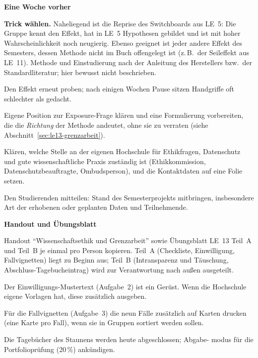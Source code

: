 \begin{vorbereitung}
\textbf{Eine Woche vorher}
\begin{checkliste}
  \item \textbf{Trick wählen.} Naheliegend ist die Reprise des
    Switchboards aus LE~5: Die Gruppe kennt den Effekt, hat in LE~5
    Hypothesen gebildet und ist mit hoher Wahrscheinlichkeit noch neugierig.
    Ebenso geeignet ist jeder andere Effekt des Semesters, dessen Methode
    nicht im Buch offengelegt ist (z.\,B.\ der Seileffekt aus LE~11).
    Methode und Einstudierung nach der Anleitung des Herstellers bzw.\ der
    Standardliteratur; hier bewusst nicht beschrieben.
  \item Den Effekt erneut proben; nach einigen Wochen Pause sitzen
    Handgriffe oft schlechter als gedacht.
  \item Eigene Position zur Exposure-Frage klären und eine Formulierung
    vorbereiten, die die \emph{Richtung} der Methode andeutet, ohne sie zu
    verraten (siehe Abschnitt~\ref{sec:le13-grenzarbeit}).
  \item Klären, welche Stelle an der eigenen Hochschule für
    Ethikfragen, Datenschutz und gute wissenschaftliche Praxis zuständig
    ist (Ethikkommission, Datenschutzbeauftragte, Ombudsperson), und die
    Kontaktdaten auf eine Folie setzen.
  \item Den Studierenden mitteilen: Stand des Semesterprojekts mitbringen,
    insbesondere Art der erhobenen oder geplanten Daten und Teilnehmende.
\end{checkliste}

\textbf{Handout und Übungsblatt}
\begin{checkliste}
  \item Handout \enquote{Wissenschaftsethik und Grenzarbeit} sowie
    Übungsblatt LE~13 Teil~A und Teil~B je einmal pro Person kopieren.
    Teil~A (Checkliste, Einwilligung, Fallvignetten) liegt zu Beginn aus;
    Teil~B (Intransparenz und Täuschung, Abschluss-Tagebucheintrag) wird
    zur Verantwortung nach außen ausgeteilt.
  \item Der Einwilligungs-Mustertext (Aufgabe~2) ist ein Gerüst. Wenn die
    Hochschule eigene Vorlagen hat, diese zusätzlich ausgeben.
  \item Für die Fallvignetten (Aufgabe~3) die neun Fälle zusätzlich auf
    Karten drucken (eine Karte pro Fall), wenn sie in Gruppen sortiert
    werden sollen.
  \item Die Tagebücher des Staunens werden heute abgeschlossen; Abgabe-
    modus für die Portfolioprüfung (20\,\%) ankündigen.
\end{checkliste}


\end{vorbereitung}
